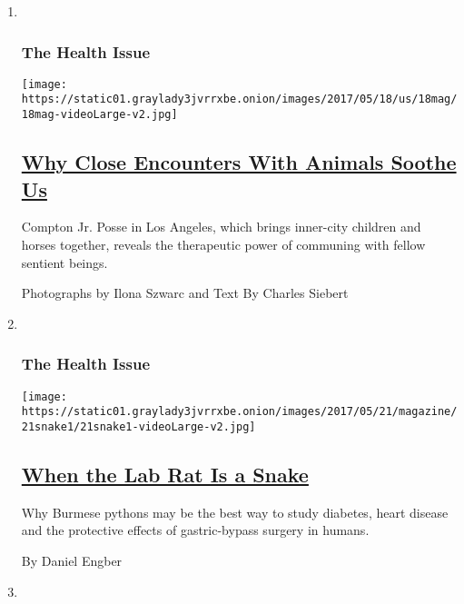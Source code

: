 \begin{enumerate}
\def\labelenumi{\arabic{enumi}.}
\item ~
  \hypertarget{the-health-issue-4}{%
  \subsubsection{The Health Issue}\label{the-health-issue-4}}

  \texttt{[image: https://static01.graylady3jvrrxbe.onion/images/2017/05/18/us/18mag/18mag-videoLarge-v2.jpg]}

  \hypertarget{why-close-encounters-with-animals-soothe-us}{%
  \subsection{\texorpdfstring{\href{/2017/05/18/magazine/why-close-encounters-with-animals-soothe-us.html}{Why
  Close Encounters With Animals Soothe
  Us}}{Why Close Encounters With Animals Soothe Us}}\label{why-close-encounters-with-animals-soothe-us}}

  Compton Jr. Posse in Los Angeles, which brings inner-city children and
  horses together, reveals the therapeutic power of communing with
  fellow sentient beings.

  Photographs by Ilona Szwarc and Text By Charles Siebert
\item ~
  \hypertarget{the-health-issue-5}{%
  \subsubsection{The Health Issue}\label{the-health-issue-5}}

  \texttt{[image: https://static01.graylady3jvrrxbe.onion/images/2017/05/21/magazine/21snake1/21snake1-videoLarge-v2.jpg]}

  \hypertarget{when-the-lab-rat-is-a-snake}{%
  \subsection{\texorpdfstring{\href{/2017/05/17/magazine/when-the-lab-rat-is-a-snake.html}{When
  the Lab Rat Is a
  Snake}}{When the Lab Rat Is a Snake}}\label{when-the-lab-rat-is-a-snake}}

  Why Burmese pythons may be the best way to study diabetes, heart
  disease and the protective effects of gastric-bypass surgery in
  humans.

  By Daniel Engber
\item ~
  \hypertarget{the-health-issue-6}{%
}
\end{enumerate}

